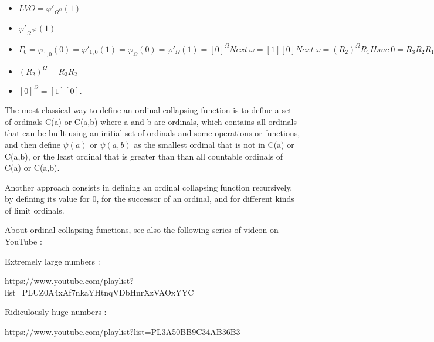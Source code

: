 \documentclass[10pt]{article}
\begin{document}
\begin{itemize}
\item \( LVO = \varphi'_{\Omega^\Omega}(1) \)
\item \( \varphi'_{\Omega^{\Omega^\Omega}}(1) \)

\item \( \Gamma_0 = \varphi_{1,0}(0) = \varphi'_{1,0}(1) = \varphi_\Omega(0) = \varphi'_\Omega(1) = [0]^\Omega Next\ \omega = [1] [0] Next\ \omega = (R_2)^\Omega R_1 H suc\ 0 = R_3 R_2 R_1 H suc\ 0 \) 

\item \( (R_2)^\Omega = R_3 R_2 \)

\item \( [0]^\Omega = [1] [0] \).

\end{itemize}

\begin{comment}

We will now see another way to use collapsing : ordinal collapsing functions.

An ordinal collapsing function is a function that, when applied to an uncountable ordinal, gives a countable ordinal.

\end{comment}

\bigskip


The most classical way to define an ordinal collapsing function is to define a set of ordinals C(a) or C(a,b) where a and b are ordinals, which contains all ordinals that can be built using an initial set of ordinals and some operations or functions, and then define \( \psi(a) \) or \( \psi(a,b) \) as the smallest ordinal that is not in C(a) or C(a,b), or the least ordinal that is greater than than all countable ordinals of C(a) or C(a,b).

Another approach consists in defining an ordinal collapsing function recursively, by defining its value for 0, for the successor of an ordinal, and for different kinds of limit ordinals.

\bigskip

About ordinal collapsing functions, see also the following series of videon on YouTube :

Extremely large numbers :

https://www.youtube.com/playlist?list=PLUZ0A4xAf7nkaYHtnqVDbHnrXzVAOxYYC

Ridiculously huge numbers :

https://www.youtube.com/playlist?list=PL3A50BB9C34AB36B3

\bigskip
\end{document}
